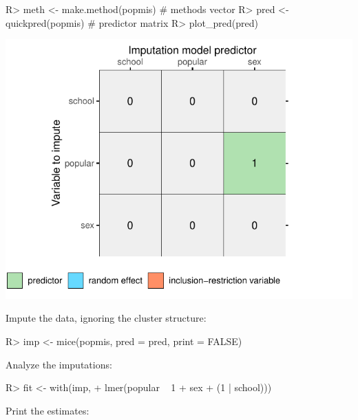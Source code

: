 \documentclass[
]{jss}
\begin{document}
\begin{CodeChunk}
\begin{CodeInput}
R> meth <- make.method(popmis) # methods vector
R> pred <- quickpred(popmis)   # predictor matrix
R> plot_pred(pred)
\end{CodeInput}


\begin{center}\includegraphics{Imputation_of_Incomplete_Multilevel_Data_files/figure-latex/pop-ignored-pred-1} \end{center}

\end{CodeChunk}

Impute the data, ignoring the cluster structure:

\begin{CodeChunk}
\begin{CodeInput}
R> imp <- mice(popmis, pred = pred, print = FALSE)
\end{CodeInput}
\end{CodeChunk}

Analyze the imputations:

\begin{CodeChunk}
\begin{CodeInput}
R> fit <- with(imp, 
+             lmer(popular ~ 1 + sex  + (1 | school))) 
\end{CodeInput}
\end{CodeChunk}

Print the estimates:
\end{document}
